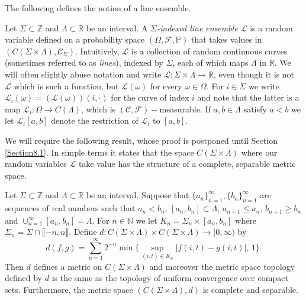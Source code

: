 The following defines the notion of a line ensemble.
\begin{definition}\label{CLEDef}
Let $\Sigma \subset \mathbb{Z}$ and $\Lambda \subset \mathbb{R}$ be an interval. A {\em $\Sigma$-indexed line ensemble $\mathcal{L}$} is a random variable defined on a probability space $(\Omega, \mathcal{F}, \mathbb{P})$ that takes values in $\left(C (\Sigma \times \Lambda), \mathcal{C}_{\Sigma}\right)$. Intuitively, $\mathcal{L}$ is a collection of random continuous curves (sometimes referred to as {\em lines}), indexed by $\Sigma$,  each of which maps $\Lambda$ in $\mathbb{R}$. We will often slightly abuse notation and write $\mathcal{L}: \Sigma \times \Lambda \rightarrow \mathbb{R}$, even though it is not $\mathcal{L}$ which is such a function, but $\mathcal{L}(\omega)$ for every $\omega \in \Omega$. For $i \in \Sigma$ we write $\mathcal{L}_i(\omega) = (\mathcal{L}(\omega))(i, \cdot)$ for the curve of index $i$ and note that the latter is a map $\mathcal{L}_i: \Omega \rightarrow C(\Lambda)$, which is $(\mathcal{C}, \mathcal{F})-$measurable. If $a,b \in \Lambda$ satisfy $a < b$ we let $\mathcal{L}_i[a,b]$ denote the restriction of $\mathcal{L}_i$ to $[a,b]$.
\end{definition}

We will require the following result, whose proof is postponed until Section \ref{Section8.1}. In simple terms it states that the space $C (\Sigma \times \Lambda)$ where our random variables $\mathcal{L}$ take value has the structure of a complete, separable metric space. 

\begin{lemma}\label{Polish} Let $\Sigma \subset \mathbb{Z}$ and $\Lambda \subset \mathbb{R}$ be an interval. Suppose that $\{a_n\}_{n = 1}^\infty, \{b_n\}_{n = 1}^\infty$ are sequences of real numbers such that $a_n < b_n$, $[a_n, b_n] \subset \Lambda$, $a_{n+1} \leq a_n$, $b_{n+1} \geq b_n$ and $\cup_{n = 1}^\infty [a_n, b_n] = \Lambda$. For $n \in \mathbb{N}$ we let $K_n = \Sigma_n \times [a_n, b_n]$ where $\Sigma_n = \Sigma \cap \llbracket -n, n \rrbracket$. Define $d: C (\Sigma \times \Lambda) \times C (\Sigma \times \Lambda) \rightarrow [0, \infty)$ by
\begin{equation} d (f,g) = \sum_{n=1}^\infty 2^{-n}\min\bigg\{\sup_{(i,t)\in K_n} |f(i,t) - g(i,t)|, \, 1\bigg\}.
\end{equation}
Then $d$ defines a metric on $C (\Sigma \times \Lambda) $ and moreover the metric space topology defined by $d$ is the same as the topology of uniform convergence over compact sets. Furthermore, the metric space $(C (\Sigma \times \Lambda), d)$ is complete and separable.
\end{lemma}

